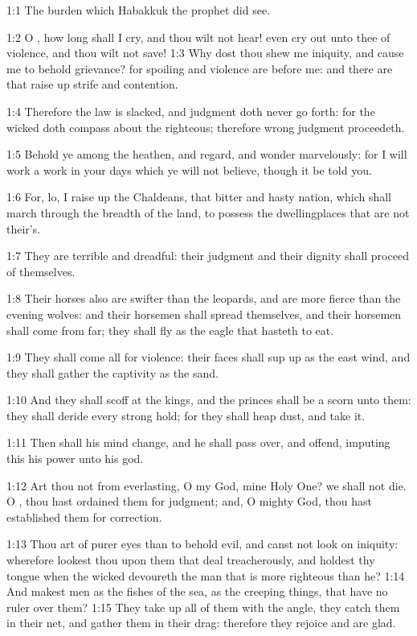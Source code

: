 

1:1 The burden which Habakkuk the prophet did see.

1:2 O \LORD, how long shall I cry, and thou wilt not hear! even cry out
unto thee of violence, and thou wilt not save!  1:3 Why dost thou shew
me iniquity, and cause me to behold grievance? for spoiling and
violence are before me: and there are that raise up strife and
contention.

1:4 Therefore the law is slacked, and judgment doth never go forth:
for the wicked doth compass about the righteous; therefore wrong
judgment proceedeth.

1:5 Behold ye among the heathen, and regard, and wonder marvelously:
for I will work a work in your days which ye will not believe, though
it be told you.

1:6 For, lo, I raise up the Chaldeans, that bitter and hasty nation,
which shall march through the breadth of the land, to possess the
dwellingplaces that are not their's.

1:7 They are terrible and dreadful: their judgment and their dignity
shall proceed of themselves.

1:8 Their horses also are swifter than the leopards, and are more
fierce than the evening wolves: and their horsemen shall spread
themselves, and their horsemen shall come from far; they shall fly as
the eagle that hasteth to eat.

1:9 They shall come all for violence: their faces shall sup up as the
east wind, and they shall gather the captivity as the sand.

1:10 And they shall scoff at the kings, and the princes shall be a
scorn unto them: they shall deride every strong hold; for they shall
heap dust, and take it.

1:11 Then shall his mind change, and he shall pass over, and offend,
imputing this his power unto his god.

1:12 Art thou not from everlasting, O \LORD my God, mine Holy One? we
shall not die. O \LORD, thou hast ordained them for judgment; and, O
mighty God, thou hast established them for correction.

1:13 Thou art of purer eyes than to behold evil, and canst not look on
iniquity: wherefore lookest thou upon them that deal treacherously,
and holdest thy tongue when the wicked devoureth the man that is more
righteous than he?  1:14 And makest men as the fishes of the sea, as
the creeping things, that have no ruler over them?  1:15 They take up
all of them with the angle, they catch them in their net, and gather
them in their drag: therefore they rejoice and are glad.

